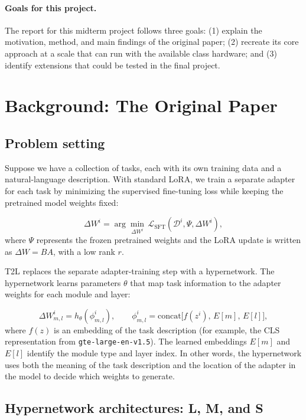 \documentclass{article}
\begin{document}
\paragraph{Goals for this project.}
The report for this midterm project follows three goals: (1) explain the motivation, method, and main findings of the original paper; (2) recreate its core approach at a scale that can run with the available class hardware; and (3) identify extensions that could be tested in the final project.

\section{Background: The Original Paper}

\subsection{Problem setting}

Suppose we have a collection of tasks, each with its own training data and a natural-language description. With standard LoRA, we train a separate adapter for each task by minimizing the supervised fine-tuning loss while keeping the pretrained model weights fixed:

\begin{equation}
\Delta W^i = \arg\min_{\Delta W^i}\,\mathcal{L}_{\mathrm{SFT}}(\mathcal{D}^i,\Psi,\Delta W^i),
\end{equation}
where $\Psi$ represents the frozen pretrained weights and the LoRA update is written as $\Delta W = BA$, with a low rank $r$.

T2L replaces the separate adapter-training step with a hypernetwork. The hypernetwork learns parameters $\theta$ that map task information to the adapter weights for each module and layer:

\begin{equation}
\Delta W^i_{m,l} = h_\theta(\phi^i_{m,l}),\qquad
\phi^i_{m,l}=\mathrm{concat}\big[f(z^i),\,E[m],\,E[l]\big],
\end{equation}
where $f(z)$ is an embedding of the task description (for example, the CLS representation from \texttt{gte-large-en-v1.5}). The learned embeddings $E[m]$ and $E[l]$ identify the module type and layer index. In other words, the hypernetwork uses both the meaning of the task description and the location of the adapter in the model to decide which weights to generate.

\subsection{Hypernetwork architectures: L, M, and S}
\end{document}
